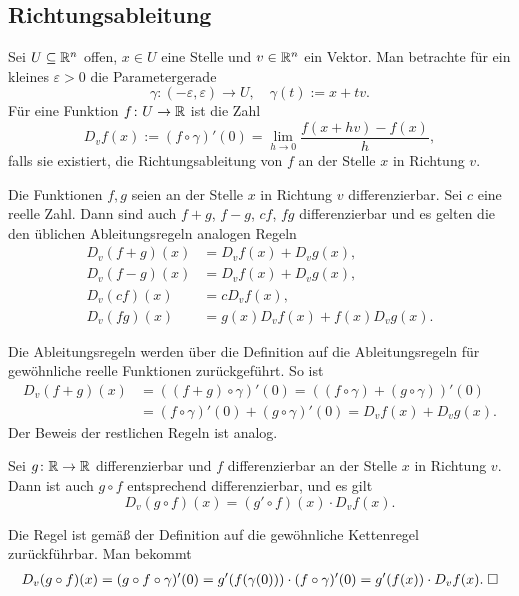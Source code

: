 \subsection{Richtungsableitung}

\begin{Definition}[Richtungsableitung]
Sei $U\subseteq\mathbb R^n$ offen, $x\in U$ eine Stelle und $v\in\mathbb R^n$
ein Vektor. Man betrachte für ein kleines $\varepsilon>0$
die Parametergerade
\[\gamma\colon(-\varepsilon,\varepsilon)\to U,\quad \gamma(t):=x+tv.\]
Für eine Funktion $f\colon U\to\mathbb R$ ist die Zahl
\[D_v f(x) := (f\circ\gamma)'(0) = \lim_{h\to 0}\frac{f(x+hv)-f(x)}{h},\]
falls sie existiert, die Richtungsableitung von $f$ an der Stelle $x$ in
Richtung $v$.
\end{Definition}
\begin{Korollar}
Die Funktionen $f,g$ seien an der Stelle $x$ in Richtung $v$
differenzierbar. Sei $c$ eine reelle Zahl. Dann sind auch
$f+g$, $f-g$, $cf$, $fg$ differenzierbar und es gelten die
den üblichen Ableitungsregeln analogen Regeln
\begin{align*}
D_v(f+g)(x) &= D_v f(x)+D_v g(x),\\
D_v(f-g)(x) &= D_v f(x)+D_v g(x),\\
D_v(cf)(x) &= cD_v f(x),\\
D_v(fg)(x) &= g(x)D_v f(x) + f(x)D_v g(x).
\end{align*}
\end{Korollar}
\begin{Beweis}
Die Ableitungsregeln werden über die Definition
auf die Ableitungsregeln für gewöhnliche reelle Funktionen
zurückgeführt. So ist
\begin{align*}
D_v(f+g)(x) &= ((f+g)\circ\gamma)'(0)
= ((f\circ\gamma)+(g\circ\gamma))'(0)\\
&= (f\circ\gamma)'(0)+(g\circ\gamma)'(0)
= D_v f(x) + D_v g(x).
\end{align*}
Der Beweis der restlichen Regeln ist analog.\,\qedsymbol
\end{Beweis}

\begin{Korollar}[Kettenregel]\newlinefirst
Sei $g\colon\mathbb R\to\mathbb R$ differenzierbar und
$f$ differenzierbar an der Stelle $x$ in Richtung $v$. Dann ist
auch $g\circ f$ entsprechend differenzierbar, und es gilt
\[D_v(g\circ f)(x) = (g'\circ f)(x)\cdot D_v f(x).\]
\end{Korollar}
\begin{Beweis}
Die Regel ist gemäß der Definition auf die gewöhnliche Kettenregel
zurückführbar. Man bekommt
\begin{align*}
D_v(g\circ f)(x) = (g\circ f\circ\gamma)'(0)
= g'(f(\gamma(0)))\cdot (f\circ\gamma)'(0)
= g'(f(x))\cdot D_v f(x).\;\square
\end{align*}
\end{Beweis}

